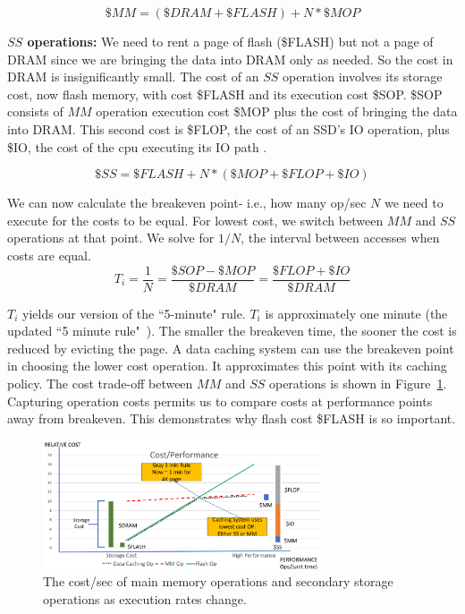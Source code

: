 \documentclass[11pt]{article}
\begin{document}
\begin{equation}\$MM = (\$DRAM + \$FLASH) + N*\$MOP \end{equation} 

{\bf $SS$ operations:} We need to rent a page of flash (\$FLASH) but not a page of DRAM since we are bringing the data into DRAM only as needed.  So the cost in DRAM is insignificantly small.  The cost of an $SS$ operation involves its storage cost, now flash memory, with cost \$FLASH and its execution cost \$SOP.  \$SOP consists of $MM$ operation execution cost \$MOP plus the cost of bringing the data into DRAM.  This second cost is \$FLOP, the cost of an SSD's IO operation, plus \$IO, the cost of the cpu executing its IO path .

  
\begin{equation}\$SS = \$FLASH + N*(\$MOP + \$FLOP + \$IO) \end{equation} 

We can now calculate the breakeven point- i.e., how many op/sec $N$ we need to execute for the costs to be equal.  For lowest cost, we switch between $MM$ and $SS$ operations at that point. 
We solve for $1/N$, the interval between accesses when costs are equal.
\begin{equation} \label{eq:Ti}
T_i = \frac{1}{N} = \frac{\$SOP - \$MOP}{\$DRAM} = \frac{\$FLOP + \$IO}{\$DRAM}
\end{equation}

$T_i$ yields our version of the ``5-minute" rule.  $T_i$ is approximately one minute (the updated ``5 minute rule"~\cite{gray1}). The smaller the breakeven time, the sooner the cost is reduced by evicting the page.  A data caching system can use the breakeven point in choosing the lower cost operation.   It approximates this point with its caching policy.  The cost trade-off between $MM$ and $SS$ operations is shown in Figure~\ref{fig:MMSS}. Capturing operation costs permits us to compare costs at performance points away from breakeven. This demonstrates why flash cost \$FLASH is so important.


\begin{figure}
\centering
\includegraphics[height=1.5in]{breakeven.png}
\caption{The cost/sec of main memory operations and secondary storage operations as execution rates change.}
\label{fig:MMSS}
\end{figure}
\end{document}
